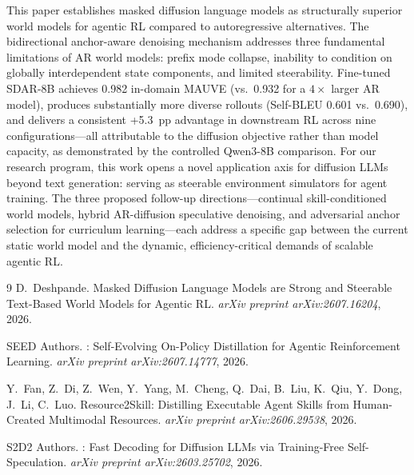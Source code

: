 \documentclass[11pt,a4paper]{article}
\begin{document}
This paper establishes masked diffusion language models as structurally superior world models for agentic RL compared to autoregressive alternatives. The bidirectional anchor-aware denoising mechanism addresses three fundamental limitations of AR world models: prefix mode collapse, inability to condition on globally interdependent state components, and limited steerability. Fine-tuned SDAR-8B achieves 0.982 in-domain MAUVE (vs.\ 0.932 for a $4\times$ larger AR model), produces substantially more diverse rollouts (Self-BLEU 0.601 vs.\ 0.690), and delivers a consistent +5.3~pp advantage in downstream RL across nine configurations---all attributable to the diffusion objective rather than model capacity, as demonstrated by the controlled Qwen3-8B comparison. For our research program, this work opens a novel application axis for diffusion LLMs beyond text generation: serving as steerable environment simulators for agent training. The three proposed follow-up directions---continual skill-conditioned world models, hybrid AR-diffusion speculative denoising, and adversarial anchor selection for curriculum learning---each address a specific gap between the current static world model and the dynamic, efficiency-critical demands of scalable agentic RL.


\begin{thebibliography}{9}
D.~Deshpande.
\newblock Masked Diffusion Language Models are Strong and Steerable Text-Based World Models for Agentic RL.
\newblock \emph{arXiv preprint arXiv:2607.16204}, 2026.

{SEED Authors}.
: Self-Evolving On-Policy Distillation for Agentic Reinforcement Learning.
\newblock \emph{arXiv preprint arXiv:2607.14777}, 2026.

Y.~Fan, Z.~Di, Z.~Wen, Y.~Yang, M.~Cheng, Q.~Dai, B.~Liu, K.~Qiu, Y.~Dong, J.~Li, C.~Luo.
\newblock Resource2Skill: Distilling Executable Agent Skills from Human-Created Multimodal Resources.
\newblock \emph{arXiv preprint arXiv:2606.29538}, 2026.

{S2D2 Authors}.
: Fast Decoding for Diffusion LLMs via Training-Free Self-Speculation.
\newblock \emph{arXiv preprint arXiv:2603.25702}, 2026.
\end{thebibliography}
\end{document}
